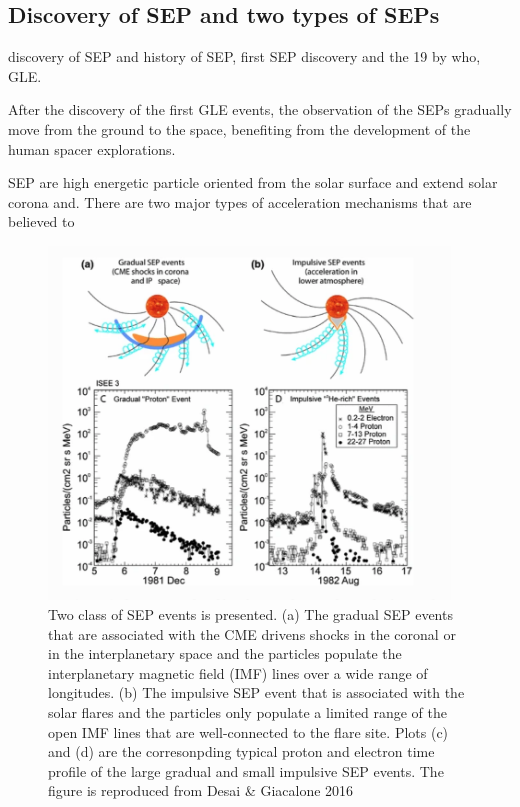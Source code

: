 \subsection{Discovery of SEP and two types of SEPs}
discovery of SEP and history of SEP, first SEP discovery and the  19 by who, GLE.

After the discovery of the first GLE events, the observation of the SEPs gradually move from the ground to the space, benefiting from the development of the human spacer explorations.

SEP are high energetic particle oriented from the solar surface and extend solar corona and. There are two major types of acceleration mechanisms that are believed to 


\begin{figure}
	\centering
	\includegraphics[width = 0.95\textwidth]{images/SEP_two_type.png}
	\caption[Two type of Solar energetic particle (SEP) event]{Two class of SEP events is presented. (a) The gradual SEP events that are associated with the CME drivens shocks in the coronal or in the interplanetary space and the particles populate the interplanetary magnetic field (IMF) lines over a wide range of longitudes. (b) The impulsive SEP event that is associated with the solar flares and the particles only populate a limited range of the open IMF lines that are well-connected to the flare site. Plots (c) and (d) are the corresonpding typical proton and electron time profile of the large gradual and small impulsive SEP events. The figure is reproduced from Desai \& Giacalone 2016}
	\label{Fig:two_type_SEP}
\end{figure}

